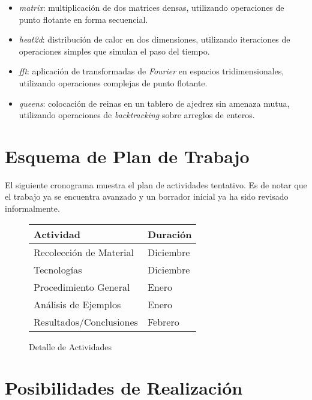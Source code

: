 \documentclass[a4paper]{article}
\begin{document}
\begin{itemize}

\item \emph{matrix}: multiplicaci\'on de dos matrices densas, utilizando
  operaciones de punto flotante en forma secuencial.

\item \emph{heat2d}: distribuci\'on de calor en dos dimensiones, utilizando
  iteraciones de operaciones simples que simulan el paso del tiempo.

\item \emph{fft}: aplicaci\'on de transformadas de {\it Fourier} en espacios
  tridimensionales, utilizando operaciones complejas de punto flotante.

\item \emph{queens}: colocaci\'on de reinas en un tablero de ajedrez sin
  amenaza mutua, utilizando operaciones de {\it backtracking} sobre arreglos
  de enteros.

\end{itemize}

\section{Esquema de Plan de Trabajo}

El siguiente cronograma muestra el plan de actividades tentativo.
Es de notar que el trabajo ya se encuentra avanzado y un borrador
inicial ya ha sido revisado informalmente.

\begin{figure}[H]
  \begin{center}
    \begin{tabular}{|l|l|}\hline
      {\bf Actividad} & {\bf Duraci\'on} \\ \hline
      Recolecci\'on de Material & Diciembre \\ \hline
      Tecnolog\'ias & Diciembre \\ \hline
      Procedimiento General & Enero \\ \hline
      An\'alisis de Ejemplos & Enero \\ \hline
      Resultados/Conclusiones & Febrero \\ \hline
    \end{tabular}
    \caption{Detalle de Actividades}
  \end{center}
  \label{schedule}
\end{figure}

\section{Posibilidades de Realizaci\'on}
\end{document}
